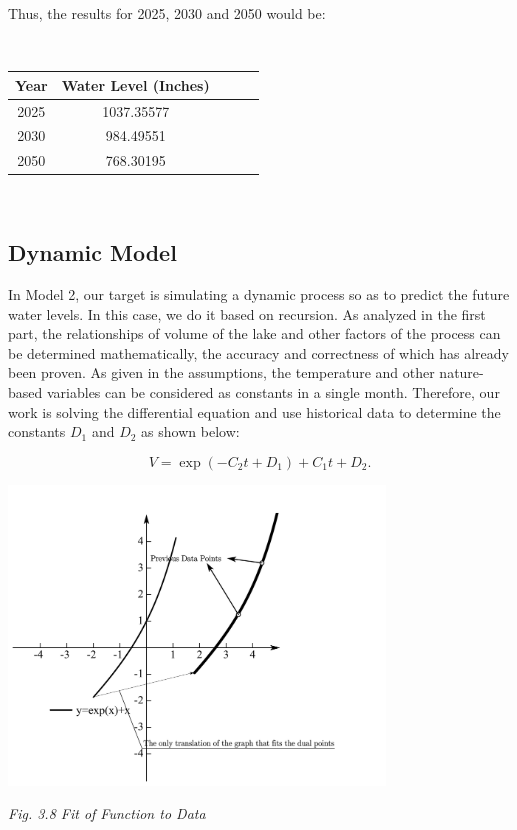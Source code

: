 \documentclass[12pt]{article}
\theoremstyle{definition}
\theoremstyle{remark}
\numberwithin{equation}{section}
\begin{document}
		Thus, the results for 2025, 2030 and 2050 would be:

		~\\
		\begin{center}
		\begin{tabular}{ccccc}
			\hline
			Year&Water Level (Inches)\\
			\hline
			2025&1037.35577\\
			2030&984.49551\\
			2050&768.30195\\
			\hline
		\end{tabular}
		\end{center}
		~\\

	\subsection{Dynamic Model}

		In Model 2, our target is simulating a dynamic process so as to predict the future water levels. In this case, we do it based on recursion. As analyzed in the first part, the relationships of volume of the lake and other factors of the process can be determined mathematically, the accuracy and correctness of which has already been proven. As given in the assumptions, the temperature and other nature-based variables can be considered as constants in a single month. Therefore, our work is solving the differential equation and use historical data to determine the constants $D_1$ and $D_2$ as shown below:

		$$
		V=\exp (-C_2  t + D_1) + C_1 t + D_2.
		$$

		\begin{center}
		\includegraphics[width=10cm]{3.8 Fit of Function to Data.jpg}

		\small \textit{Fig. 3.8 Fit of Function to Data}
		\end{center}
\end{document}

